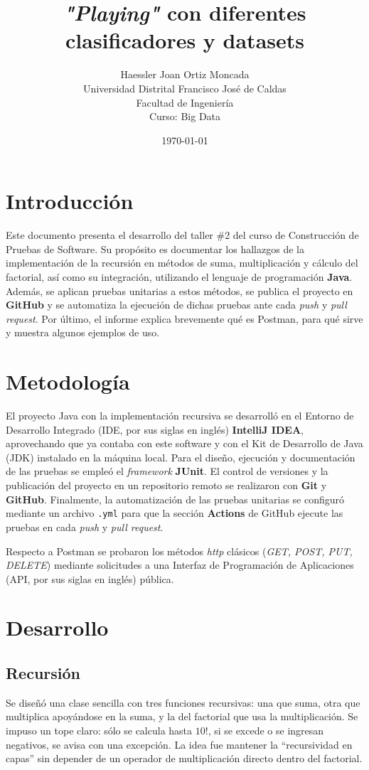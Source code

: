 \documentclass[12pt,a4paper]{article}
\title{\textbf{\textit{"Playing"} con diferentes clasificadores y datasets}}
\author{Haessler Joan Ortiz Moncada \\[0.5cm]
        Universidad Distrital Francisco José de Caldas \\
        Facultad de Ingeniería \\
        Curso: Big Data}
\date{\today}
\begin{document}
\maketitle

\section{Introducción}
Este documento presenta el desarrollo del taller \#2 del curso de Construcción de Pruebas de Software. 
Su propósito es documentar los hallazgos de la implementación de la recursión en métodos de suma, 
multiplicación y cálculo del factorial, así como su integración, utilizando el lenguaje de programación 
\textbf{Java}. Además, se aplican pruebas unitarias a estos métodos, se publica el proyecto en \textbf{GitHub} 
y se automatiza la ejecución de dichas pruebas ante cada \textit{push} y \textit{pull request}. Por último, 
el informe explica brevemente qué es Postman, para qué sirve y muestra algunos ejemplos de uso.

\section{Metodología}
El proyecto Java con la implementación recursiva se desarrolló en el Entorno de Desarrollo Integrado 
(IDE, por sus siglas en inglés) \textbf{IntelliJ IDEA}, aprovechando que ya contaba con este software y con 
el Kit de Desarrollo de Java (JDK) instalado en la máquina local. Para el diseño, ejecución y documentación 
de las pruebas se empleó el \textit{framework} \textbf{JUnit}. El control de versiones y la publicación del 
proyecto en un repositorio remoto se realizaron con \textbf{Git} y \textbf{GitHub}. Finalmente, la automatización 
de las pruebas unitarias se configuró mediante un archivo \texttt{.yml} para que la sección \textbf{Actions} de 
GitHub ejecute las pruebas en cada \textit{push} y \textit{pull request}.

Respecto a Postman se probaron los métodos \textit{http} clásicos (\textit{GET, POST, PUT, DELETE}) mediante 
solicitudes a una Interfaz de Programación de Aplicaciones (API, por sus siglas en inglés) pública.

\section{Desarrollo}

\subsection{Recursión}
Se diseñó una clase sencilla con tres funciones recursivas: una que suma, otra que multiplica apoyándose en la 
suma, y la del factorial que usa la multiplicación. Se impuso un tope claro: sólo se calcula hasta \(10!\), si se 
excede o se ingresan negativos, se avisa con una excepción. La idea fue mantener la ``recursividad en capas'' 
sin depender de un operador de multiplicación directo dentro del factorial.
\end{document}
